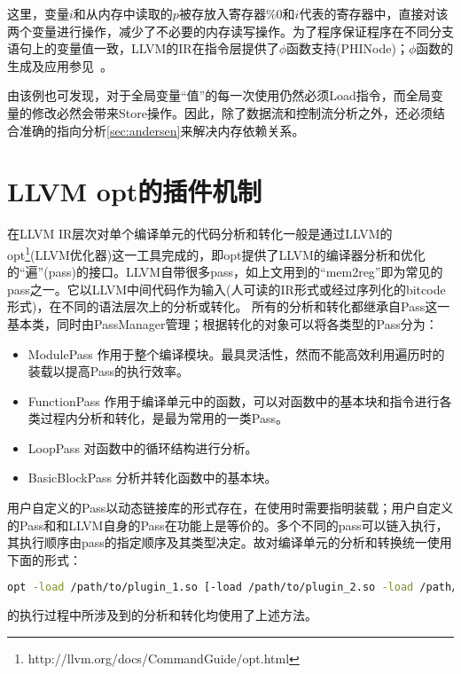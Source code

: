 这里，变量$i$和从内存中读取的$p$被存放入寄存器$\%0$和$i$代表的寄存器中，直接对该两个变量进行操作，减少了不必要的内存读写操作。为了程序保证程序在不同分支语句上的变量值一致，LLVM的IR在指令层提供了$\phi$函数支持(PHINode)；$\phi$函数的生成及应用参见~\cite{SSA}。

由该例也可发现，对于全局变量“值”的每一次使用仍然必须Load指令，而全局变量的修改必然会带来Store操作。因此，除了数据流和控制流分析之外，还必须结合准确的指向分析\autoref{sec:andersen}来解决内存依赖关系。

\section{LLVM opt的插件机制}
\label{sec:plugin}
在LLVM IR层次对单个编译单元的代码分析和转化一般是通过LLVM的opt\footnote{http://llvm.org/docs/CommandGuide/opt.html}(LLVM优化器)这一工具完成的，即opt提供了LLVM的编译器分析和优化的“遍”(pass)的接口。LLVM自带很多pass，如上文用到的“mem2reg”即为常见的pass之一。它以LLVM中间代码作为输入(人可读的IR形式或经过序列化的bitcode形式)，在不同的语法层次上的分析或转化。
所有的分析和转化都继承自Pass这一基本类，同时由PassManager管理；根据转化的对象可以将各类型的Pass分为：
\begin{itemize}
\item \textmd{ModulePass} 作用于整个编译模块。最具灵活性，然而不能高效利用遍历时的装载以提高Pass的执行效率。
\item \textmd{FunctionPass} 作用于编译单元中的函数，可以对函数中的基本块和指令进行各类过程内分析和转化，是最为常用的一类Pass。
\item \textmd{LoopPass} 对函数中的循环结构进行分析。
\item \textmd{BasicBlockPass} 分析并转化函数中的基本块。
\end{itemize}

用户自定义的Pass以动态链接库的形式存在，在使用时需要指明装载；用户自定义的Pass和和LLVM自身的Pass在功能上是等价的。多个不同的pass可以链入执行，其执行顺序由pass的指定顺序及其类型决定。故对编译单元的分析和转换统一使用下面的形式：

\begin{lstlisting}[language=bash]
  opt -load /path/to/plugin_1.so [-load /path/to/plugin_2.so -load /path/to/plugin_m.so] -pass_a1 [-pass_a2 ... -pass_an] input.bc -o output.bc
\end{lstlisting}

\dryrun 的执行过程中所涉及到的分析和转化均使用了上述方法。
